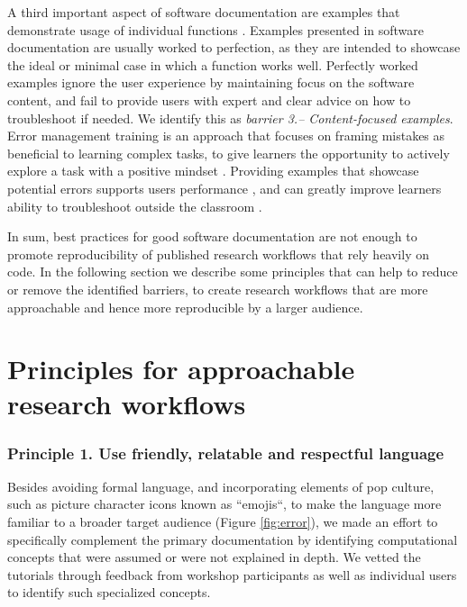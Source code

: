 \documentclass[12pt]{article}
\begin{document}
A third important aspect of software documentation are examples that demonstrate usage of individual functions \citep{karimzadeh2018top}.
Examples presented in software documentation are usually worked to perfection, as they are intended to showcase the ideal or minimal case in which a function works well.
Perfectly worked examples ignore the user experience by maintaining focus on the software content, and fail to provide users with expert and clear advice on how to troubleshoot if needed.
We identify this as \textit{barrier 3.-- Content-focused examples}.
Error management training is an approach that focuses on framing mistakes as beneficial to learning complex tasks, to give learners the opportunity to
actively explore a task with a positive mindset \citep{frese1995error}.
Providing examples that showcase potential errors supports users performance \citep{steele2014error}, and can greatly improve learners ability to troubleshoot outside the classroom \citep{shannon2015live, nederbragt2020ten}.


In sum, best practices for good software documentation are not enough to promote reproducibility of published research workflows that rely heavily on code. 
In the following section we describe some principles that can help to reduce or remove the identified barriers, to create research workflows that are more approachable and hence more reproducible by a larger audience.

\section*{Principles for approachable research workflows}
\label{sec:addressing}

\subsubsection*{Principle 1. Use friendly, relatable and respectful language}


Besides avoiding formal language, and incorporating elements of pop culture, such as picture character icons known as ``emojis``, to make the language more familiar to a broader target audience (Figure \ref{fig:error}), we made an effort to specifically complement the primary documentation by identifying computational concepts that were assumed or were not explained in depth.
We vetted the tutorials through feedback from workshop participants as well as individual users to identify such specialized concepts.
\end{document}
